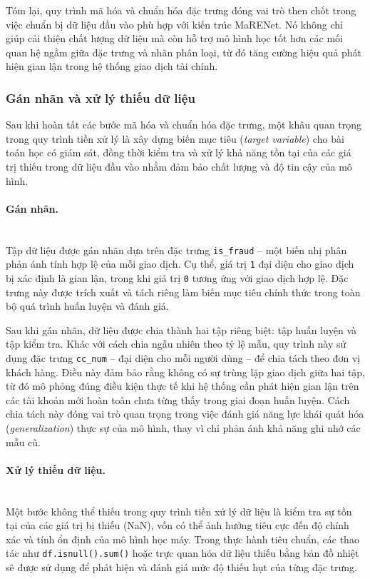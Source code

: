 Tóm lại, quy trình mã hóa và chuẩn hóa đặc trưng đóng vai trò then chốt trong việc chuẩn bị dữ liệu đầu vào phù hợp với kiến trúc MaRENet. Nó không chỉ giúp cải thiện chất lượng dữ liệu mà còn hỗ trợ mô hình học tốt hơn các mối quan hệ ngầm giữa đặc trưng và nhãn phân loại, từ đó tăng cường hiệu quả phát hiện gian lận trong hệ thống giao dịch tài chính.

\subsubsection{Gán nhãn và xử lý thiếu dữ liệu}

Sau khi hoàn tất các bước mã hóa và chuẩn hóa đặc trưng, một khâu quan trọng trong quy trình tiền xử lý là xây dựng biến mục tiêu (\textit{target variable}) cho bài toán học có giám sát, đồng thời kiểm tra và xử lý khả năng tồn tại của các giá trị thiếu trong dữ liệu đầu vào nhằm đảm bảo chất lượng và độ tin cậy của mô hình.

\paragraph{Gán nhãn.}
\mbox{}\\
Tập dữ liệu được gán nhãn dựa trên đặc trưng \texttt{is\_fraud} – một biến nhị phân phản ánh tính hợp lệ của mỗi giao dịch. Cụ thể, giá trị \texttt{1} đại diện cho giao dịch bị xác định là gian lận, trong khi giá trị \texttt{0} tương ứng với giao dịch hợp lệ. Đặc trưng này được trích xuất và tách riêng làm biến mục tiêu chính thức trong toàn bộ quá trình huấn luyện và đánh giá.

Sau khi gán nhãn, dữ liệu được chia thành hai tập riêng biệt: tập huấn luyện và tập kiểm tra. Khác với cách chia ngẫu nhiên theo tỷ lệ mẫu, quy trình này sử dụng đặc trưng \texttt{cc\_num} – đại diện cho mỗi người dùng – để chia tách theo đơn vị khách hàng. Điều này đảm bảo rằng không có sự trùng lặp giao dịch giữa hai tập, từ đó mô phỏng đúng điều kiện thực tế khi hệ thống cần phát hiện gian lận trên các tài khoản mới hoàn toàn chưa từng thấy trong giai đoạn huấn luyện. Cách chia tách này đóng vai trò quan trọng trong việc đánh giá năng lực khái quát hóa (\textit{generalization}) thực sự của mô hình, thay vì chỉ phản ánh khả năng ghi nhớ các mẫu cũ.

\paragraph{Xử lý thiếu dữ liệu.}
\mbox{}\\
Một bước không thể thiếu trong quy trình tiền xử lý dữ liệu là kiểm tra sự tồn tại của các giá trị bị thiếu (NaN), vốn có thể ảnh hưởng tiêu cực đến độ chính xác và tính ổn định của mô hình học máy. Trong thực hành tiêu chuẩn, các thao tác như \texttt{df.isnull().sum()} hoặc trực quan hóa dữ liệu thiếu bằng bản đồ nhiệt sẽ được sử dụng để phát hiện và đánh giá mức độ thiếu hụt của từng đặc trưng.

